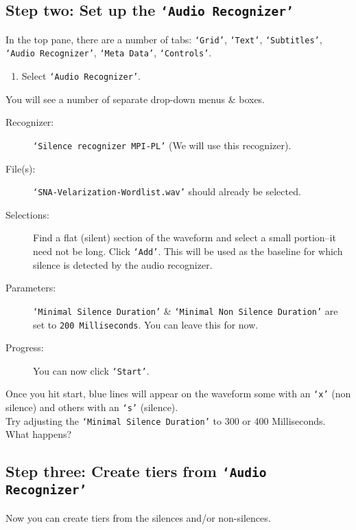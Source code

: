 \documentclass[letterpaper,12pt]{article}
\begin{document}
\subsection*{Step two: Set up the \texttt{`Audio Recognizer'}}
In the top pane, there are a number of tabs: \texttt{`Grid'}, \texttt{`Text'}, \texttt{`Subtitles'}, \texttt{`Audio Recognizer'}, \texttt{`Meta Data'}, \texttt{`Controls'}.\\
\begin{enumerate}
\item Select \texttt{`Audio Recognizer'}.
\end{enumerate}
You will see a number of separate drop-down menus \& boxes.
\begin{description}
\item[Recognizer: ] \texttt{`Silence recognizer MPI-PL'} (We will use this recognizer).
\item[File(s): ] \texttt{`SNA-Velarization-Wordlist.wav'} should already be selected.
\item[Selections: ] Find a flat (silent) section of the waveform and select a small portion--it need not be long. Click \texttt{`Add'}. This will be used as the baseline for which silence is detected by the audio recognizer.
\item[Parameters: ] \texttt{`Minimal Silence Duration'} \& \texttt{`Minimal Non Silence Duration'} are set to \texttt{200 Milliseconds}. You can leave this for now. 
\item[Progress: ] You can now click \texttt{`Start'}. 
\end{description} 
Once you hit start, blue lines will appear on the waveform some with an \texttt{`x'} (non silence) and others with an \texttt{`s'} (silence).\\

\noindent Try adjusting the \texttt{`Minimal Silence Duration'} to 300 or 400 Milliseconds. What happens?
\subsection*{Step three: Create tiers from \texttt{`Audio Recognizer'}}
Now you can create tiers from the silences and/or non-silences. 
\end{document}
